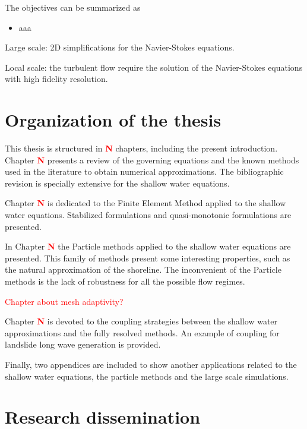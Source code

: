 The objectives can be summarized as
\begin{itemize}
    \item aaa
\end{itemize}

Large scale: 2D simplifications for the Navier-Stokes equations.

Local scale: the turbulent flow require the solution of the Navier-Stokes equations with high fidelity resolution.




\section{Organization of the thesis}


This thesis is structured in \textcolor{red}{\bfseries N} chapters, including the present introduction. Chapter \textcolor{red}{\bfseries N} presents a review of the governing equations and the known methods used in the literature to obtain numerical approximations. The bibliographic revision is specially extensive for the shallow water equations.

Chapter \textcolor{red}{\bfseries N} is dedicated to the Finite Element Method applied to the shallow water equations. Stabilized formulations and quasi-monotonic formulations are presented.

In Chapter \textcolor{red}{\bfseries N} the Particle methods applied to the shallow water equations are presented. This family of methods present some interesting properties, such as the natural approximation of the shoreline. The inconvenient of the Particle methods is the lack of robustness for all the possible flow regimes.

\textcolor{red}{Chapter about mesh adaptivity?}

Chapter \textcolor{red}{\bfseries N} is devoted to the coupling strategies between the shallow water approximations and the fully resolved methods. An example of coupling for landslide long wave generation is provided.

Finally, two appendices are included to show another applications related to the shallow water equations, the particle methods and the large scale simulations.




\section{Research dissemination}


